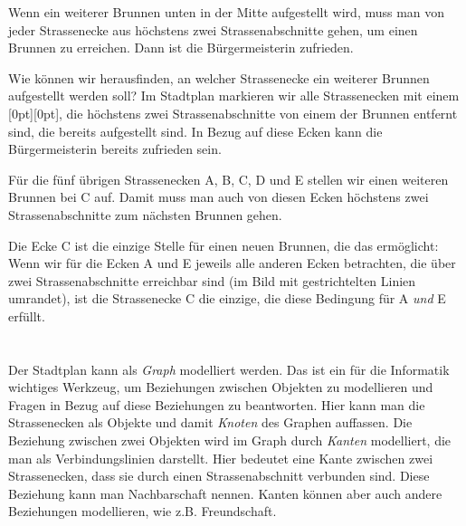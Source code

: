 {{{\centering%
\par}

Wenn ein weiterer Brunnen unten in der Mitte aufgestellt wird, muss man von jeder Strassenecke aus höchstens zwei Strassenabschnitte gehen, um einen Brunnen zu erreichen.
Dann ist die Bürgermeisterin zufrieden.

Wie können wir herausfinden, an welcher Strassenecke
ein weiterer Brunnen aufgestellt werden soll?
Im Stadtplan markieren wir alle Strassenecken mit einem \raisebox{-0.5ex}[0pt][0pt]{},
die höchstens zwei Strassenabschnitte von einem der Brunnen entfernt sind, die bereits aufgestellt sind.
In Bezug auf diese Ecken kann die Bürgermeisterin bereits zufrieden sein.

{\centering%
\par}

Für die fünf übrigen Strassenecken A, B, C, D und E stellen wir einen weiteren Brunnen bei C auf. Damit muss man auch von diesen Ecken höchstens zwei Strassenabschnitte zum nächsten Brunnen gehen.

Die Ecke C ist die einzige Stelle für einen neuen Brunnen, die das ermöglicht:
Wenn wir für die Ecken A und E jeweils alle anderen Ecken betrachten, die über zwei Strassenabschnitte erreichbar sind (im Bild mit gestrichtelten Linien umrandet),
ist die Strassenecke C die einzige, die diese Bedingung für A \emph{und} E erfüllt.



\section*{\BrochureItsInformatics}
Der Stadtplan kann als \emph{Graph} modelliert werden.
Das ist ein für die Informatik wichtiges Werkzeug, um Beziehungen zwischen Objekten zu modellieren
und Fragen in Bezug auf diese Beziehungen zu beantworten.
Hier kann man die Strassenecken als Objekte und damit \emph{Knoten} des Graphen auffassen.
Die Beziehung zwischen zwei Objekten wird im Graph durch \emph{Kanten} modelliert, die man als Verbindungslinien darstellt. Hier bedeutet eine Kante zwischen zwei Strassenecken, dass sie durch einen Strassenabschnitt verbunden sind. Diese Beziehung kann man Nachbarschaft nennen. Kanten können aber auch andere Beziehungen modellieren, wie z.B. Freundschaft.

}}
